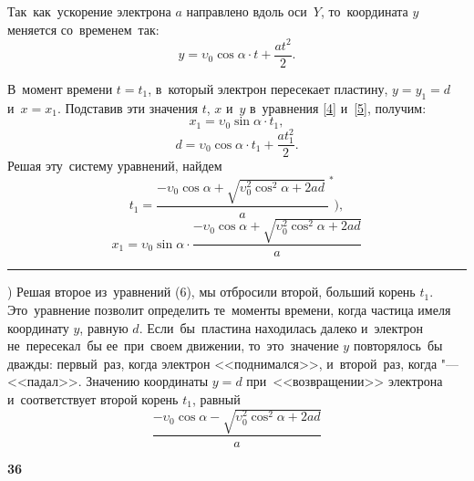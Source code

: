 \begin{multicols}{2}
	Так~как~ускорение электрона $a$ направлено вдоль оси~$Y$, то~координата $y$ меняется со~временем~так:
	\[
		y=\upsilon_0 \cos \alpha \cdot t + \frac{a t^2}{2}. \tag{5} \label{5}
	\]

	В~момент времени $t=t_1$, в~который электрон пересекает пластину, $y=y_1=d$ и~$x=x_1$. Подставив эти значения $t$, $x$ и~$y$ в~уравнения \eqref{4} и~\eqref{5}, получим:
	\[
		x_1=\upsilon_0 \sin \alpha \cdot t_1{,}
	\]
	\[
		d=\upsilon_0 \cos \alpha \cdot t_1 + \frac{a t^2_1}{2}. \tag{6} \label{6}
	\]
	Решая эту~систему уравнений, найдем
	\[
		t_1=\frac{- \upsilon_0 \cos \alpha + \sqrt{\upsilon_0^2 \cos^2 \alpha + 2ad}\ }{a}^*\Biggr), \tag{7} \label{7}
	\]
	\[
		x_1=\upsilon_0 \sin \alpha \cdot \frac{- \upsilon_0 \cos \alpha + \sqrt{\upsilon_0^2 \cos^2 \alpha + 2ad}}{a}
	\]

	\vspace{1mm}
	\noindent\rule{9.5cm}{0,5pt}
	\vspace{1mm}
		
	{\small *) Решая второе из~уравнений (6), мы отбросили второй, больший корень $t_1$. Это~уравнение позволит определить те~моменты времени, когда частица имеля координату $y$, равную $d$. Если~бы~пластина находилась далеко и~электрон не~пересекал~бы ее~при~своем движении, то~это~значение $y$ повторялось~бы дважды: первый~раз, когда электрон <<поднимался>>, и~второй~раз, когда "--- <<падал>>. Значению координаты $y=d$ при~<<возвращении>> электрона и~соответствует второй корень $t_1$, равный
	\[
		\frac{- \upsilon_0 \cos \alpha - \sqrt{\upsilon_0^2 \cos^2 \alpha + 2ad}}{a}
	\]}

\end{multicols}
	
\begin{flushleft}
	{\small \textbf{36}}
\end{flushleft}